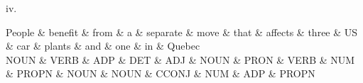 iv. \\
 \begin{center}
 {\small
 \begin{dependency}[] 
 \begin{deptext}
People \& benefit \& from \& a \& separate \& move \& that \& affects \& three \& US \& car \& plants \& and \& one \& in \& Quebec \\
NOUN \& VERB \& ADP \& DET \& ADJ \& NOUN \& PRON \& VERB \& NUM \& PROPN \& NOUN \& NOUN \& CCONJ \& NUM \& ADP \& PROPN \\
\end{deptext}
\end{dependency}
 }
 \end{center}